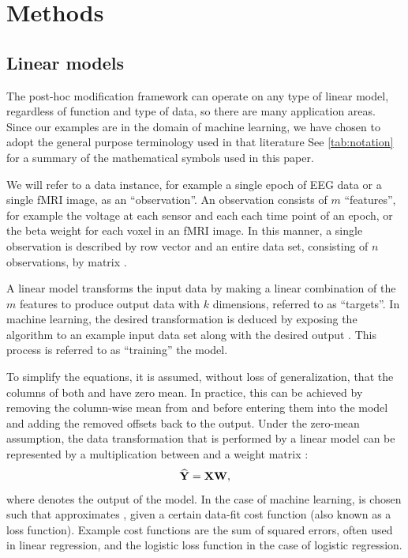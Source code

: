 \documentclass[a4paper]{vanvliet_paper}
\begin{document}
\section{Methods}

\subsection{Linear models}

The post-hoc modification framework can operate on any type of linear model, regardless of function and type of data, so there are many application areas.
Since our examples are in the domain of machine learning, we have chosen to adopt the general purpose terminology used in that literature\cite{Hastie2009}
See \autoref{tab:notation} for a summary of the mathematical symbols used in this paper. 

We will refer to a data instance, for example a single epoch of \gls{EEG} data or a single \gls{fMRI} image, as an ``observation''.
An observation consists of $m$ ``features'', for example the voltage at each sensor and each each time point of an epoch, or the beta weight for each voxel in an \gls{fMRI} image.
In this manner, a single observation is described by row vector  and an entire data set, consisting of $n$ observations, by matrix .

A linear model transforms the input data by making a linear combination of the $m$ features to produce output data with $k$ dimensions, referred to as ``targets''.
In machine learning, the desired transformation is deduced by exposing the algorithm to an example input data set  along with the desired output .
This process is referred to as ``training'' the model.

To simplify the equations, it is assumed, without loss of generalization, that the columns of both  and  have zero mean.
In practice, this can be achieved by removing the column-wise mean from  and  before entering them into the model and adding the removed offsets back to the output.
Under the zero-mean assumption, the data transformation that is performed by a linear model can be represented by a multiplication between  and a weight matrix :
\begin{equation}\label{eq:linear}
    \widehat{\mathbf{Y}} = \mathbf{X}\mathbf{W},
\end{equation}
where  denotes the output of the model.
In the case of machine learning,  is chosen such that  approximates , given a certain data-fit cost function (also known as a loss function).
Example cost functions are the sum of squared errors, often used in linear regression, and the logistic loss function in the case of logistic regression.
\end{document}
